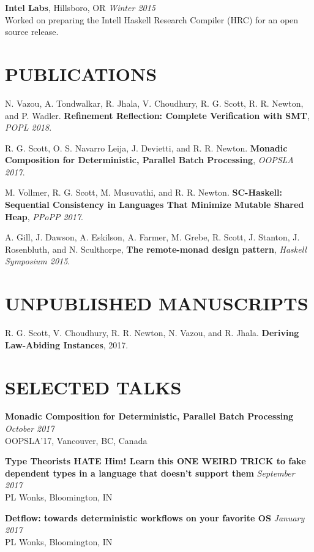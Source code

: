\documentclass{res}
\begin{document}
\begin{resume}
    \textbf{Intel Labs}, Hillsboro, OR \hfill \textit{Winter 2015} \\
    Worked on preparing the Intell Haskell Research Compiler (HRC) for an open source release.

\section{PUBLICATIONS}
    N. Vazou, A. Tondwalkar, R. Jhala, V. Choudhury, R. G. Scott, R. R. Newton, and P. Wadler. \textbf{Refinement Reflection: Complete Verification with SMT}, \textit{POPL 2018}.

    R. G. Scott, O. S. Navarro Leija, J. Devietti, and R. R. Newton. \textbf{Monadic Composition for Deterministic, Parallel Batch Processing}, \textit{OOPSLA 2017}.

    M. Vollmer, R. G. Scott, M. Musuvathi, and R. R. Newton. \textbf{SC-Haskell: Sequential Consistency in Languages That Minimize Mutable Shared Heap}, \textit{PPoPP 2017}.

    A. Gill, J. Dawson, A. Eskilson, A. Farmer, M. Grebe, R. Scott, J. Stanton, J. Rosenbluth, and N. Sculthorpe, \textbf{The remote-monad design pattern}, \textit{Haskell Symposium 2015}.


\section{UNPUBLISHED MANUSCRIPTS}
    R. G. Scott, V. Choudhury, R. R. Newton, N. Vazou, and R. Jhala. \textbf{Deriving Law-Abiding Instances}, 2017.

\section{SELECTED TALKS}
    \textbf{Monadic Composition for Deterministic, Parallel Batch Processing} \hfill \textit{October 2017} \\
    OOPSLA'17, Vancouver, BC, Canada

    \textbf{Type Theorists HATE Him! Learn this ONE WEIRD TRICK to fake dependent types in a language that doesn’t support them} \hfill \textit{September 2017} \\
    PL Wonks, Bloomington, IN

    \textbf{Detflow: towards deterministic workflows on your favorite OS} \hfill \textit{January 2017} \\
    PL Wonks, Bloomington, IN


\end{resume}
\end{document}
